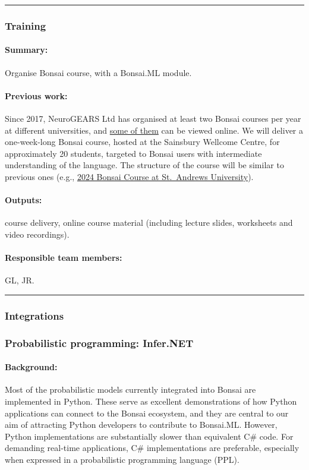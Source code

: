 \noindent\rule{\textwidth}{1pt}
\subsubsection*{Training}

\paragraph{Summary:} Organise Bonsai course, with a Bonsai.ML module.

\paragraph{Previous work:} Since 2017, NeuroGEARS Ltd has organised at least
two Bonsai courses per year at different universities, and
\href{https://bonsai-rx.org/learn/}{some of them} can be viewed online. We will
deliver a one-week-long Bonsai course, hosted at the Sainsbury Wellcome Centre,
for approximately 20 students, targeted to Bonsai users with intermediate
understanding of the language. The structure of the course will be similar to
previous ones (e.g., \href{https://neurogears.org/st-andrews-2024/}{2024 Bonsai
Course at St.~Andrews University}).

\paragraph{Outputs:} course delivery, online course material (including lecture
slides, worksheets and video recordings).

\paragraph{Responsible team members:} GL, JR.

\noindent\rule{\textwidth}{1pt}
\subsubsection*{Integrations}

\subsubsection*{Probabilistic programming: Infer.NET}

\paragraph{Background:} Most of the probabilistic models currently integrated
into Bonsai are implemented in Python. These serve as excellent demonstrations
of how Python applications can connect to the Bonsai ecosystem, and they are
central to our aim of attracting Python developers to contribute to Bonsai.ML.
%
However, Python implementations are substantially slower than equivalent C\#
code. For demanding real-time applications, C\# implementations are preferable,
especially when expressed in a probabilistic programming language (PPL).

